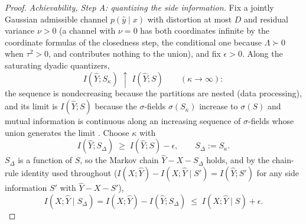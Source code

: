 \documentclass[11pt,onecolumn]{IEEEtran}
\newcommand{\hY}{\widehat{Y}}
\begin{document}
\begin{proof}
\emph{Achievability, Step A: quantizing the side information.} Fix a jointly
Gaussian admissible channel $p(\hat y\mid x)$ with distortion at most
$D$ and residual variance $\nu>0$ (a channel with $\nu=0$ has both
coordinates infinite by the coordinate formulas of the closedness step,
the conditional one because $\Lambda\succ0$ when $\tau^2>0$, and
contributes nothing to the union), and fix $\epsilon>0$. Along the saturating dyadic quantizers,
\begin{equation}
I(\hY;S_\kappa)\;\uparrow\;I(\hY;S)\qquad(\kappa\to\infty):
\label{eq:quant-mono}
\end{equation}
the sequence is nondecreasing because the partitions are nested (data
processing), and its limit is $I(\hY;S)$ because the $\sigma$-fields
$\sigma(S_\kappa)$ increase to $\sigma(S)$ and mutual information is
continuous along an increasing sequence of $\sigma$-fields whose union
generates the limit \cite[Ch.~2]{pinsker1964}. Choose $\kappa$ with
\begin{equation}
I(\hY;S_\Delta)\;\ge\;I(\hY;S)-\epsilon,
\qquad S_\Delta:=S_\kappa .
\label{eq:quant-approx}
\end{equation}
$S_\Delta$ is a function of $S$, so the Markov chain $\hY-X-S_\Delta$
holds, and by the chain-rule identity used throughout
($I(X;\hY)-I(X;\hY\mid S')=I(\hY;S')$ for any side information $S'$ with
$\hY-X-S'$),
\begin{equation}
I(X;\hY\mid S_\Delta)=I(X;\hY)-I(\hY;S_\Delta)
\;\le\;I(X;\hY\mid S)+\epsilon .
\label{eq:quant-chain}
\end{equation}


\end{proof}
\end{document}
